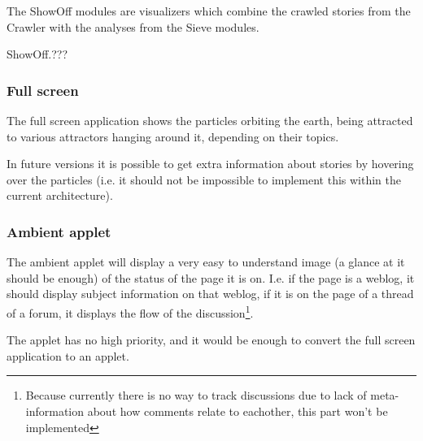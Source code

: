 The ShowOff modules are visualizers which combine the crawled stories from the
Crawler with the analyses from the Sieve modules.

\begin{module}{ShowOff.???}
\end{module}

\subsubsection{Full screen}

The full screen application shows the particles orbiting the earth, being
attracted to various attractors hanging around it, depending on their topics.

In future versions it is possible to get extra information about stories by
hovering over the particles (i.e. it should not be impossible to implement this
within the current architecture).

\subsubsection{Ambient applet}

The ambient applet will display a very easy to understand image (a glance at it
should be enough) of the status of the page it is on. I.e. if the page is a
weblog, it should display subject information on that weblog, if it is on the
page of a thread of a forum, it displays the flow of the
discussion\footnote{Because currently there is no way to track discussions due
to lack of meta-information about how comments relate to eachother, this part
won't be implemented}.

The applet has no high priority, and it would be enough to convert the full
screen application to an applet.
